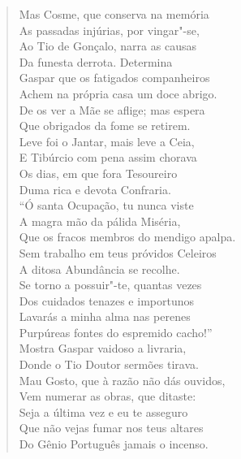 \begin{verse}
Mas Cosme, que conserva na memória\\
As passadas injúrias, por vingar"-se,\\
Ao Tio de Gonçalo, narra as causas\\
Da funesta derrota. Determina\\
Gaspar que os fatigados companheiros\\
Achem na própria casa um doce abrigo.\\
De os ver a Mãe se aflige; mas espera\\
Que obrigados da fome se retirem.\\
Leve foi o Jantar, mais leve a Ceia,\\
E Tibúrcio com pena assim chorava\\
Os dias, em que fora Tesoureiro\\
Duma rica e devota Confraria.\\
``Ó santa Ocupação, tu nunca viste\\
A magra mão da pálida Miséria,\\
Que os fracos membros do mendigo apalpa.\\
Sem trabalho em teus próvidos Celeiros\\
A ditosa Abundância se recolhe.\\
Se torno a possuir"-te, quantas vezes\\
Dos cuidados tenazes e importunos\\
Lavarás a minha alma nas perenes\\
Purpúreas fontes do espremido cacho!'' \\[10pt]


Mostra Gaspar vaidoso a livraria,\\
Donde o Tio Doutor sermões tirava.\\
Mau Gosto, que à razão não dás ouvidos,\\
Vem numerar as obras, que ditaste:\\
Seja a última vez e eu te asseguro\\
Que não vejas fumar nos teus altares\\
Do Gênio Português jamais o incenso. \\[10pt]



\end{verse}
